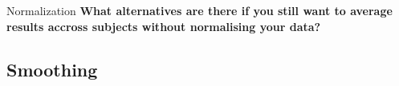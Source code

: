 \documentclass{beamer}
\begin{document}
\begin{frame}{Normalization}
  \textbf{What alternatives are there if you still want to average results accross subjects without normalising your data?}

\end{frame}

%

\subsection[Smoothing]{Smoothing}
\end{document}
